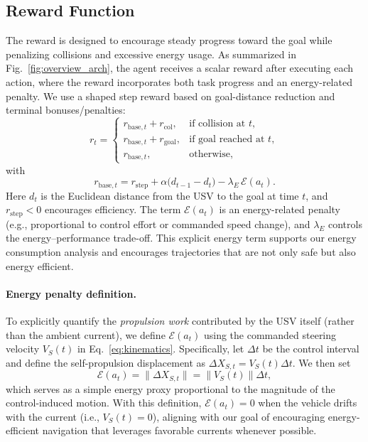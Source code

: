 \subsection{Reward Function}
\label{sec:method_reward}
The reward is designed to encourage steady progress toward the goal while penalizing collisions and excessive energy usage. As summarized in Fig.~\ref{fig:overview_arch}, the agent receives a scalar reward after executing each action, where the reward incorporates both task progress and an energy-related penalty. We use a shaped step reward based on goal-distance reduction and terminal bonuses/penalties:
\begin{equation}
r_t=
\begin{cases}
r_{\mathrm{base},t} + r_{\mathrm{col}}, & \text{if collision at } t,\\
r_{\mathrm{base},t} + r_{\mathrm{goal}}, & \text{if goal reached at } t,\\
r_{\mathrm{base},t}, & \text{otherwise},
\end{cases}
\label{eq:reward_piecewise}
\end{equation}
with
\begin{equation}
r_{\mathrm{base},t}
=
r_{\mathrm{step}} + \alpha\big(d_{t-1}-d_t\big) - \lambda_E\,\mathcal{E}(a_t).
\label{eq:reward_base}
\end{equation}
Here $d_t$ is the Euclidean distance from the USV to the goal at time $t$, and $r_{\mathrm{step}}<0$ encourages efficiency. The term $\mathcal{E}(a_t)$ is an energy-related penalty (e.g., proportional to control effort or commanded speed change), and $\lambda_E$ controls the energy--performance trade-off. This explicit energy term supports our energy consumption analysis and encourages trajectories that are not only safe but also energy efficient.

\paragraph{Energy penalty definition.}
To explicitly quantify the \emph{propulsion work} contributed by the USV itself (rather than the ambient current), we define $\mathcal{E}(a_t)$ using the commanded steering velocity $V_S(t)$ in Eq.~\eqref{eq:kinematics}. Specifically, let $\Delta t$ be the control interval and define the self-propulsion displacement as $\Delta X_{S,t}=V_S(t)\Delta t$. We then set
\begin{equation}
\mathcal{E}(a_t) = \|\Delta X_{S,t}\| = \|V_S(t)\|\Delta t,
\label{eq:energy_def}
\end{equation}
which serves as a simple energy proxy proportional to the magnitude of the control-induced motion. With this definition, $\mathcal{E}(a_t)=0$ when the vehicle drifts with the current (i.e., $V_S(t)=0$), aligning with our goal of encouraging energy-efficient navigation that leverages favorable currents whenever possible.

